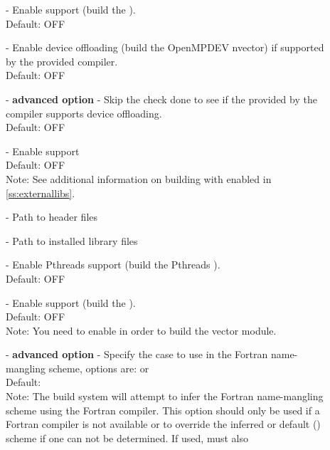 \begin{description}
\item[] -
  Enable {\openmp} support (build the {\openmp} {\nvector}).
  \\
  Default: OFF
\item[] -
  Enable {\openmp} device offloading (build the OpenMPDEV nvector) if supported by
  the provided compiler.
  \\
  Default: OFF
\item[] - \textbf{advanced option} -
  Skip the check done to see if the {\openmp} provided by the compiler
  supports {\openmp} device offloading.
  \\
  Default: OFF
\item[] -
  Enable {\petsc} support
  \\
  Default: OFF
  \\
  Note: See additional information on building with {\petsc} enabled
  in \ref{ss:externallibs}.
\item[] -
  Path to {\petsc} header files
\item[] -
  Path to {\petsc} installed library files
\item[] -
  Enable Pthreads support (build the Pthreads {\nvector}).
  \\
  Default: OFF
\item[] -
  Enable {\raja} support (build the {\raja} {\nvector}).
  \\
  Default: OFF
  \\
  Note: You need to enable {\cuda} in order to build the {\raja} vector module.
\item[] - \textbf{advanced option} -
  Specify the case to use in the Fortran name-mangling scheme, options
  are:  or 
  \\
  Default:
  \\
  Note: The build system will attempt to infer the Fortran
  name-mangling scheme using the Fortran compiler. This option should
  only be used if a Fortran compiler is not available or to override
  the inferred or default () scheme if one can not be
  determined. If used,  must also

\end{description}
